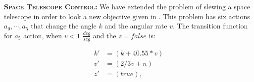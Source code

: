 






{\bf \textsc{Space Telescope Control}:} We have extended the problem of slewing a space telescope
in order to look a new objective given in \cite{DLohr:2012}. This problem has six actions $a_0, \cdots ,a_5$ that change the angle $k$ and the angular rate $v$. The transition function for $a_5$ action, when $v < 1$ $\frac{deg}{seg}$ and the $z= false$ is:

{\footnotesize
\begin{align*}
k' & =( k + 40.55*v) \\
v'& =(2/3 v + n) \\
z'& =( true ),
\end{align*}}

